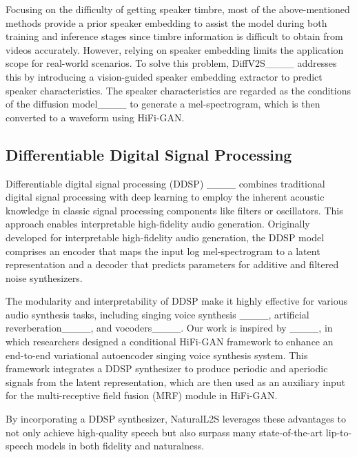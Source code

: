 Focusing on the difficulty of getting speaker timbre, most of the above-mentioned methods provide a prior speaker embedding to assist the model during both training and inference stages since timbre information is difficult to obtain from videos accurately. However, relying on speaker embedding limits the application scope for real-world scenarios. To solve this problem, DiffV2S____ addresses this by introducing a vision-guided speaker embedding extractor to predict speaker characteristics. The speaker characteristics are regarded as the conditions of the diffusion model____ to generate a mel-spectrogram, which is then converted to a waveform using HiFi-GAN. 

\subsection{Differentiable Digital Signal Processing}
Differentiable digital signal processing (DDSP) ____ combines traditional digital signal processing with deep learning to employ the inherent acoustic knowledge in classic signal processing components like filters or oscillators. This approach enables interpretable high-fidelity audio generation. Originally developed for interpretable high-fidelity audio generation, the DDSP model comprises an encoder that maps the input log mel-spectrogram to a latent representation and a decoder that predicts parameters for additive and filtered noise synthesizers.

The modularity and interpretability of DDSP make it highly effective for various audio synthesis tasks, including singing voice synthesis ____, artificial reverberation____, and vocoders____. Our work is inspired by ____, in which researchers designed a conditional HiFi-GAN framework to enhance an end-to-end variational autoencoder singing voice synthesis system. This framework integrates a DDSP synthesizer to produce periodic and aperiodic signals from the latent representation, which are then used as an auxiliary input for the multi-receptive field fusion (MRF) module in HiFi-GAN.

By incorporating a DDSP synthesizer, NaturalL2S leverages these advantages to not only achieve high-quality speech but also surpass many state-of-the-art lip-to-speech models in both fidelity and naturalness.